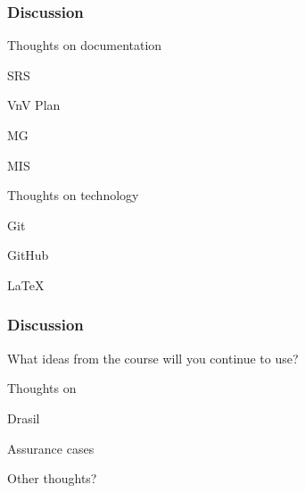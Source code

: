 \documentclass[t,12pt,numbers,fleqn]{beamer}
\begin{document}

\begin{frame}
\frametitle{Discussion}

\bi
\item Thoughts on documentation
\bi
\item SRS
\item VnV Plan
\item MG
\item MIS
\ei
\item Thoughts on technology
\bi
\item Git
\item GitHub
\item LaTeX
\ei
\ei

\end{frame}


\begin{frame}
\frametitle{Discussion}

\bi
\item What ideas from the course will you continue to use?
\item Thoughts on
\bi
\item Drasil
\item Assurance cases
\ei
\item Other thoughts?
\ei

\end{frame}

\end{document}
